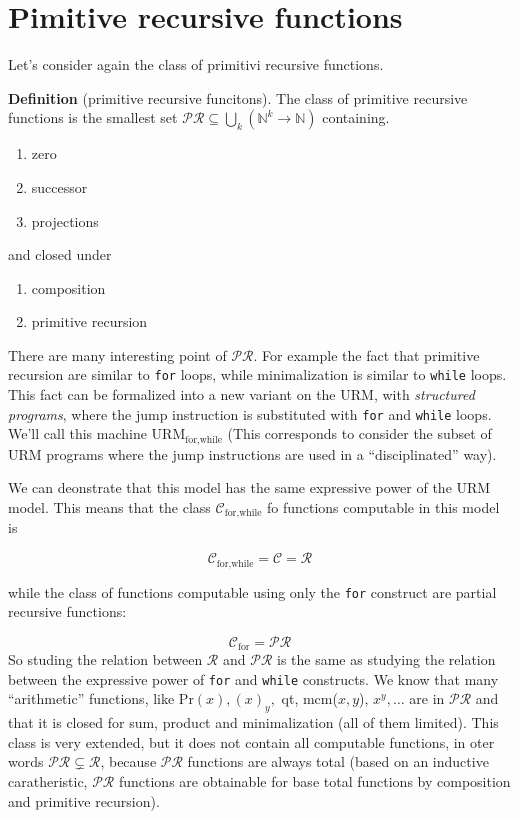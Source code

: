 \chapter{Pimitive recursive functions}
Let's consider again the class of primitivi recursive functions.

\textbf{Definition} (primitive recursive funcitons).  The class of
primitive recursive functions is the smallest set
$\mathcal{PR} \subseteq \bigcup\limits_k(\mathbb{N}^k \rightarrow
\mathbb{N})$ containing.

\begin{enumerate}[label=(\alph*)]
\item zero
\item successor
\item projections
\end{enumerate}

and closed under

\begin{enumerate}[label=(\arabic*)]
\item composition
\item primitive recursion
\end{enumerate}

There are many interesting point of $\mathcal{PR}$. For example the
fact that primitive recursion are similar to \texttt{for} loops, while
minimalization is similar to \texttt{while} loops. This fact can be
formalized into a new variant on the URM, with \textit{structured
  programs}, where the jump instruction is substituted with
\texttt{for} and \texttt{while} loops. We'll call this machine
$\text{URM}_{\text{for,while}}$ (This corresponds to consider the
subset of URM programs where the jump instructions are used in a
``disciplinated'' way).

We can deonstrate that this model has the same expressive power of the
URM model. This means that the class $\mathcal{C}_{\text{for,while}}$
fo functions computable in this model is

\[
  \mathcal{C}_{\text{for,while}} = \mathcal{C} = \mathcal{R}
\]

while the class of functions computable using only the \texttt{for}
construct are partial recursive functions:

\[
  \mathcal{C}_{\text{for}} = \mathcal{PR}
\]
So studing the relation between $\mathcal{R}$ and $\mathcal{PR}$ is
the same as studying the relation between the expressive power of
\texttt{for} and \texttt{while} constructs.  We know that many
``arithmetic'' functions, like Pr$(x), (x)_y,$ qt, mcm($x,y$),
$x^y, \dots$ are in $\mathcal{PR}$ and that it is closed for sum,
product and minimalization (all of them limited). This class is very
extended, but it does not contain all computable functions, in oter
words $\mathcal{PR} \subsetneq \mathcal{R}$, because $\mathcal{PR}$
functions are always total (based on an inductive caratheristic,
$\mathcal{PR}$ functions are obtainable for base total functions by
composition and primitive recursion).

